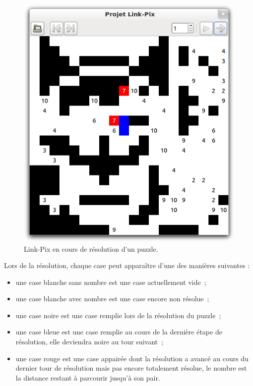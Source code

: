 \begin{figure}[h!]
      \centering
      \includegraphics[scale=0.5]{gui-4}
      \caption{Link-Pix en cours de résolution d'un puzzle.}
\end{figure}

Lors de la résolution, chaque case peut apparaître d'une des manières suivantes :
\begin{itemize}
	\item une case blanche sans nombre est une case actuellement vide~;
	\item une case blanche avec nombre est une case encore non résolue~;
	\item une case noire est une case remplie lors de la résolution du puzzle~;
	\item une case bleue est une case remplie au cours de la dernière étape de résolution, elle deviendra noire au tour suivant~;
	\item une case rouge est une case appairée dont la résolution a avancé au cours du dernier tour de résolution mais pas encore totalement résolue, le nombre est la distance restant à parcourir jusqu'à son pair.
\end{itemize}

